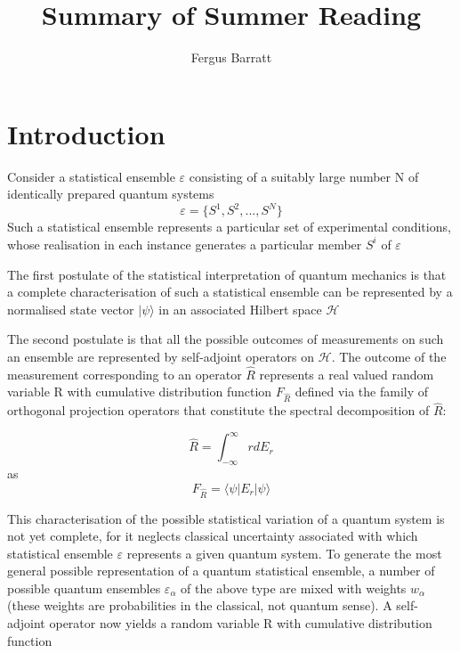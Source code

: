 \documentclass[reqno]{amsart}
\title{Summary of Summer Reading}
\author{Fergus Barratt}
\begin{document}
\maketitle

 

\section{Introduction}
\autocite{Breuer2002}
Consider a statistical ensemble $\varepsilon$ consisting of a suitably large number N of identically prepared quantum systems
\begin{equation}
	\varepsilon = \{S^1, S^2, ..., S^N\}
\end{equation}
Such a statistical ensemble represents a particular set of experimental conditions, whose realisation in each instance generates a particular member $S^i$ of  $\varepsilon$

The first postulate of the statistical interpretation of quantum mechanics is that a complete characterisation of such a statistical ensemble can be represented by a normalised state vector $| \psi \rangle$ in an associated Hilbert space $\mathcal{H}$

The second postulate is that all the possible outcomes of measurements on such an ensemble are represented by self-adjoint operators on $\mathcal{H}$. The outcome of the measurement corresponding to an operator $\hat{R}$ represents a real valued random variable R with cumulative distribution function $F_{\hat{R}}$ defined via the family of orthogonal projection operators that constitute the spectral decomposition of $\hat{R}$:

\begin{equation}
	\hat{R} = \int_{-\infty}^\infty rdE_r
\end{equation}
as
\begin{equation}
	F_{\hat{R}} = \langle \psi |E_r | \psi \rangle
\end{equation}

This characterisation of the possible statistical variation of a quantum system is not yet complete, for it neglects classical uncertainty associated with which statistical ensemble $\varepsilon$ represents a given quantum system. To generate the most general possible representation of a quantum statistical ensemble, a number of possible quantum ensembles $\varepsilon_\alpha$ of the above type are mixed with weights $w_\alpha$ (these weights are probabilities in the classical, not quantum sense). A self-adjoint operator now yields a random variable R with cumulative distribution function 
\end{document}
